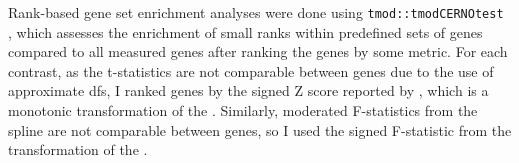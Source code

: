 Rank-based gene set enrichment analyses were done using \texttt{tmod::tmodCERNOtest} \autocite{weiner3rd2016TmodPackageGeneral}, 
which assesses the enrichment of small ranks within predefined sets of genes compared to all measured genes after ranking the genes by some metric.
For each contrast, 
as the t-statistics are not comparable between genes due to the use of approximate \glspl{df},
I ranked genes by the signed Z score reported by , which is a monotonic transformation of the \pvalue.
Similarly, moderated F-statistics from the spline are not comparable between genes, so I used the signed F-statistic from the transformation of the \pvalue.

